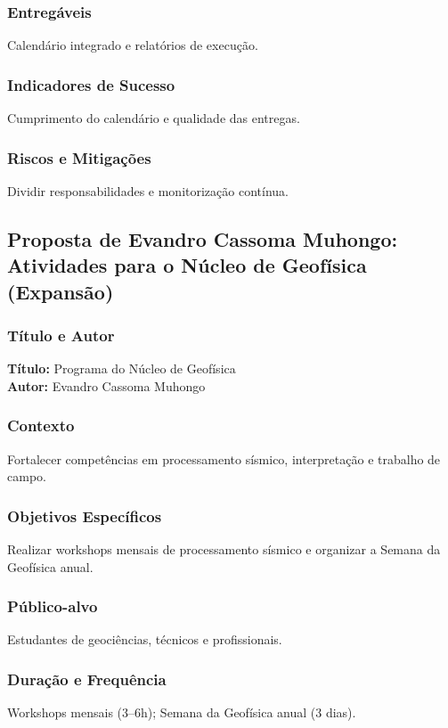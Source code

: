 \documentclass[12pt,a4paper]{article}
\begin{document}
\subsubsection*{Entregáveis}
Calendário integrado e relatórios de execução.

\subsubsection*{Indicadores de Sucesso}
Cumprimento do calendário e qualidade das entregas.

\subsubsection*{Riscos e Mitigações}
Dividir responsabilidades e monitorização contínua.

\subsection{Proposta de Evandro Cassoma Muhongo: Atividades para o Núcleo de Geofísica (Expansão)}

\subsubsection*{Título e Autor}
\textbf{Título:} Programa do Núcleo de Geofísica \\
\textbf{Autor:} Evandro Cassoma Muhongo

\subsubsection*{Contexto}
Fortalecer competências em processamento sísmico, interpretação e trabalho de campo.

\subsubsection*{Objetivos Específicos}
Realizar workshops mensais de processamento sísmico e organizar a Semana da Geofísica anual.

\subsubsection*{Público-alvo}
Estudantes de geociências, técnicos e profissionais.

\subsubsection*{Duração e Frequência}
Workshops mensais (3–6h); Semana da Geofísica anual (3 dias).
\end{document}
